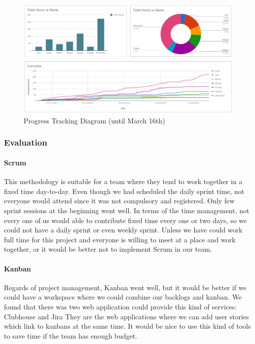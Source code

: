 \documentclass[12pt,a4paper]{article}
\begin{document}
          \begin{figure}[H]
            \centering
            \includegraphics[width=1\textwidth]{../assets/development-records-progress-tracking-diagram.png}
            \caption{Progress Tracking Diagram (until March 16th)}
            \label{fig:Progress Tracking Diagram}
          \end{figure}

      \subsubsection{Evaluation}

        \paragraph{Scrum} This methodology is suitable for a team where they tend to work together in a fixed time day-to-day. Even though we had scheduled the daily sprint time, not everyone would attend since it was not compulsory and registered. Only few sprint sessions at the beginning went well. In terms of the time management, not every one of us would able to contribute fixed time every one or two days, so we could not have a daily sprint or even weekly sprint. Unless we have could work full time for this project and everyone is willing to meet at a place and work together, or it would be better not to implement Scrum in our team. 
        
        \paragraph{Kanban} Regards of project management, Kanban went well, but it would be better if we could have a workspace where we could combine our backlogs and kanban. We found that there was two web application could provide this kind of services: Clubhouse and Jira They are the web applications where we can add user stories which link to kanbans at the same time. It would be nice to use this kind of tools to save time if the team has enough budget.
        
\end{document}
